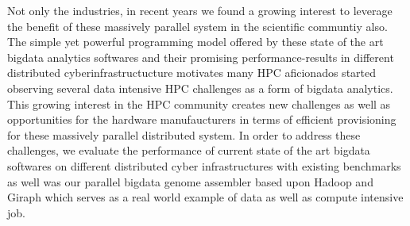 Not only the industries, in recent years we found a growing interest to leverage the benefit of these massively parallel system in the scientific communtiy also.
The simple yet powerful programming model offered by these state of the art bigdata analytics softwares and their promising performance-results in different distributed cyberinfrastructucture motivates many HPC aficionados started observing several data intensive HPC challenges as a form of bigdata analytics.
This growing interest in the HPC community creates new challenges as well as opportunities for the hardware manufaucturers in terms of efficient provisioning for these massively parallel distributed system.
In order to address these challenges, we evaluate the performance of current state of the art bigdata softwares on different distributed cyber infrastructures with existing benchmarks as well was our parallel bigdata genome assembler based upon Hadoop and Giraph which serves as a real world example of data as well as compute intensive job.

